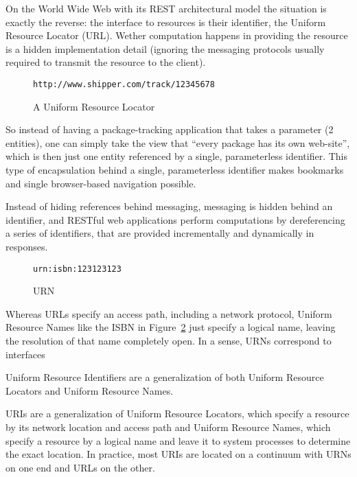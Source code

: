 \documentclass[preprint,authoryear]{acm_proc_article-sp}
\begin{document}
On the World Wide Web with its REST architectural model the situation is exactly the reverse: 
 the interface
to resources is their identifier, the Uniform Resource Locator (URL).   Wether
computation happens in providing the resource is a hidden implementation detail
(ignoring the messaging protocols usually required to transmit the resource
to the client).  


\begin{figure}[htbp]
\begin{center}
\begin{verbatim}
http://www.shipper.com/track/12345678
\end{verbatim}
\caption{A Uniform Resource Locator}
\label{url-example}
\end{center}
\end{figure}

So instead of having
a package-tracking application that takes a parameter (2 entities),
one can simply take the view that ``every package has its own 
web-site'', which is then just one entity referenced by a single,
parameterless identifier.  This type of encapsulation behind
a single, parameterless identifier makes bookmarks and single
browser-based navigation possible.


 Instead of hiding references behind messaging,
messaging is hidden behind an identifier, and RESTful web applications
perform computations by dereferencing a series of identifiers, that 
are provided incrementally and dynamically in responses.

\begin{figure}[htbp]
\begin{center}
\begin{verbatim}
urn:isbn:123123123
\end{verbatim}
\caption{URN}
\label{urn-example}
\end{center}
\end{figure}

Whereas URLs specify an access path, including a network protocol, Uniform 
Resource Names like the ISBN in Figure~\ref{urn-example} just specify a logical
name, leaving the resolution of that name completely open.  In a sense, URNs
correspond to interfaces 

Uniform Resource Identifiers are a generalization of both Uniform Resource Locators
and Uniform Resource Names.  

URIs are a generalization of Uniform Resource Locators, which specify a
resource by its network location and access path and Uniform Resource Names,
which specify
a resource by a logical name and leave it to system processes to 
determine the exact location.  In practice, most URIs are located on
a continuum with URNs on one end and URLs on the other.
\end{document}
